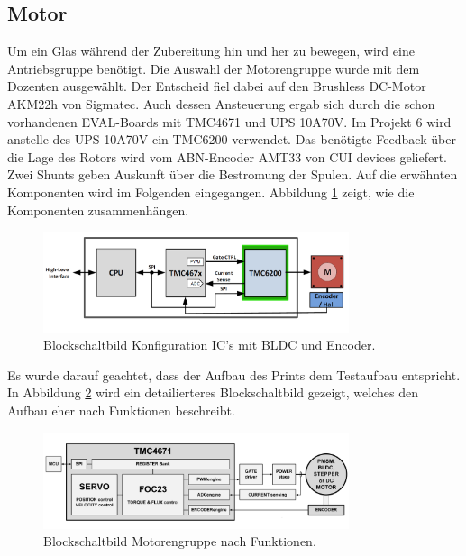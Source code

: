 \clearpage
\subsection{Motor}
\label{subsec:Motor}

Um ein Glas während der Zubereitung hin und her zu bewegen, wird eine Antriebsgruppe benötigt. Die Auswahl der Motorengruppe wurde mit dem Dozenten ausgewählt. Der Entscheid fiel dabei auf den Brushless DC-Motor AKM22h von Sigmatec. Auch dessen Ansteuerung ergab sich durch die schon vorhandenen EVAL-Boards mit TMC4671 und UPS 10A70V. Im Projekt 6 wird anstelle des UPS 10A70V ein TMC6200 verwendet. Das benötigte Feedback über die Lage des Rotors wird vom ABN-Encoder AMT33 von CUI devices geliefert. Zwei Shunts geben Auskunft über die Bestromung der Spulen. Auf die erwähnten Komponenten wird im Folgenden eingegangen. Abbildung \ref{fig:Blockdiagramm_TMC4671_und_TMC6200} zeigt, wie die Komponenten zusammenhängen.

\begin{figure}[H]
	\centering
	\includegraphics[width=0.8\textwidth]{graphics/Blockdiagramm_TMC4671_und_TMC6200}
	\caption{Blockschaltbild Konfiguration IC's mit BLDC und Encoder. \cite[S.1]{trinamicmotion_control_gmbh__co_kg_tmc6200_2019}}
	\label{fig:Blockdiagramm_TMC4671_und_TMC6200}
\end{figure}

Es wurde darauf geachtet, dass der Aufbau des Prints dem Testaufbau entspricht. In Abbildung \ref{fig:Blockdiagramm_Motorengruppe} wird ein detailierteres Blockschaltbild gezeigt, welches den Aufbau eher nach Funktionen beschreibt.

\begin{figure}[H]
	\centering
	\includegraphics[width=0.8\textwidth]{graphics/Blockdiagramm_Motorengruppe}
	\caption{Blockschaltbild Motorengruppe nach Funktionen. \cite[S.1]{trinamicmotion_control_gmbh__co_kg_tmc4671_2019}}
	\label{fig:Blockdiagramm_Motorengruppe}
\end{figure}


